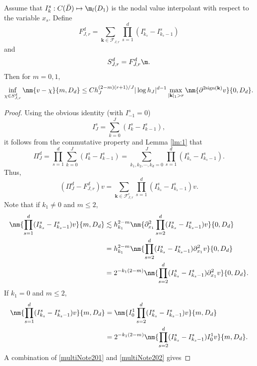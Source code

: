 \begin{lemma}
Assume that
$I^s_k: C(\bar D)\mapsto \m_l(D_1)$ is the nodal value interpolant
with respect to the variable $x_s$.  Define
$$
F_{J,r}^d=\sum_{\mathbf k\in \mathcal{F}_{J,r}}\prod_{s=1}^d(I^s_{k_s}-I^s_{k_{s}-1})
$$
and
$$
S_{J,r}^d=F_{J,r}^d\m.
$$
Then for $m=0,1$,
$$
\inf_{\chi\in S_{J,r}^d}\nm{v-\chi}{m, D_d}\le C h_J^{(2-m)(r+1)/J}|\log h_J|^{d-1}\max_{|\mathbf k|_1> r}\nm {\partial^{2\text{sign}(\mathbf k)}v}{0,D_d}.
$$
\end{lemma}
\begin{proof}
Using the obvious identity (with $I_{-1}^s=0$)
$$I^s_J=\sum_{k=0}^J(I^s_k-I^s_{k-1}),$$
it follows from the commutative property and Lemma \ref{lm:1} that
$$
\Pi_J^d=\prod_{s=1}^d\sum_{k=0}^J(I^s_{k}-I^s_{k-1})
=\sum_{k_1,k_2,\cdots, k_d=0}^J\prod_{s=1}^d(I^s_{k_s}-I^s_{k_s-1}). 
$$
Thus,
\begin{equation}\label{multiNote1}
(\Pi_J^d-F_{J,r}^d)v=
\sum_{\mathbf k\in \mathcal{F}_{J,r}^c}\prod_{s=1}^d(I^s_{k_s}-I^s_{k_s-1})v.
\end{equation}
Note that if $k_1\neq 0$ and $m\le 2$,
\begin{equation}\label{multiNote201}
\begin{split}
\nm { \prod_{s=1}^d(I^s_{k_s}-I^s_{k_s-1})v}{m,D_d}
&\lesssim h^{2-m}_{k_1}\nm {\partial^2_{x_1}\prod_{s=2}^d(I^s_{k_s}-I^s_{k_s-1})v}{0, D_d} \\
&=  h^{2-m}_{k_1}\nm {\prod_{s=2}^d(I^s_{k_s}-I^s_{k_s-1}) \partial^2_{x_1} v}{0, D_d} \\
&=2^{-k_1(2-m)}\nm {\prod_{s=2}^d(I^s_{k_s}-I^s_{k_s-1}) \partial^2_{x_1} v}{0, D_d}.
\end{split}
\end{equation}
If $k_1=0$ and $m\le 2$,
\begin{equation}\label{multiNote202}
\begin{split}
\nm { \prod_{s=1}^d(I^s_{k_s}-I^s_{k_s-1})v}{m,D_d}
&= \nm { I_0^1 \prod_{s=2}^d(I^s_{k_s}-I^s_{k_s-1})v}{m,D_d} \\ 
&=2^{-k_1(2-m)}\nm {\prod_{s=2}^d(I^s_{k_s}-I^s_{k_s-1})  I_0^1  v}{m,D_d}.
\end{split}
\end{equation}
A combination of \eqref{multiNote201} and \eqref{multiNote202} gives

\end{proof}
